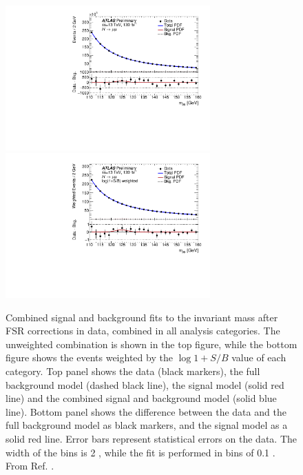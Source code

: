 \begin{figure}[h!]
  \centering
  \includegraphics[width=0.7\textwidth]{figures/hmumu/fits/inclusive}
  \includegraphics[width=0.7\textwidth]{figures/hmumu/fits/inclusive_w}
  \caption[Combined signal and background fit to data]{
  Combined signal and background fits to the invariant mass after FSR
  corrections in data, combined in all analysis categories.
  The unweighted combination is shown in the top figure, while the
  bottom figure shows the events weighted by the $\log{1 + S/B}$
  value of each category. Top panel shows the data (black
  markers), the full background model (dashed black line), the signal
  model (solid red line) and the combined signal and background model
  (solid blue line). Bottom panel shows the difference between the data
  and the full background model as black markers, and the signal model
  as a solid red line. Error bars represent statistical errors on
  the data. The width of the bins is 2 \GeV, while the fit is
  performed in bins of 0.1 \GeV.
  From Ref. \cite{ATLAS-CONF-2019-028}.
  }
  \label{fig:hmumu:fit-combination}
\end{figure}

